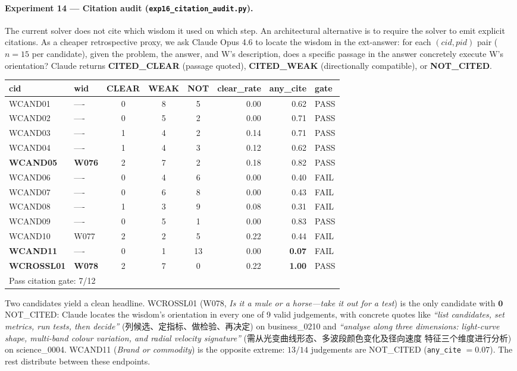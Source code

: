 \documentclass{article}
\begin{document}
\begin{CJK*}{UTF8}{gbsn}
\paragraph{Experiment 14 — Citation audit
(\texttt{exp16\_citation\_audit.py}).} The current solver does
not cite which wisdom it used on which step. An architectural
alternative is to require the solver to emit explicit citations.
As a cheaper retrospective proxy, we ask Claude Opus 4.6 to
locate the wisdom in the ext-answer: for each \((cid, pid)\)
pair (\(n = 15\) per candidate), given the problem, the answer,
and W's description, does a specific passage in the answer
concretely execute W's orientation? Claude returns
\textbf{CITED\_CLEAR} (passage quoted), \textbf{CITED\_WEAK}
(directionally compatible), or \textbf{NOT\_CITED}.

\begin{center}\small
\begin{tabular}{l l c c c r r l}
  \toprule
  cid & wid & CLEAR & WEAK & NOT & clear\_rate & any\_cite & gate \\
  \midrule
  WCAND01 & ---- & 0 & 8 & 5 & 0.00 & 0.62 & PASS \\
  WCAND02 & ---- & 0 & 5 & 2 & 0.00 & 0.71 & PASS \\
  WCAND03 & ---- & 1 & 4 & 2 & 0.14 & 0.71 & PASS \\
  WCAND04 & ---- & 1 & 4 & 3 & 0.12 & 0.62 & PASS \\
  \textbf{WCAND05} & \textbf{W076} & 2 & 7 & 2 & 0.18 & 0.82 & PASS \\
  WCAND06 & ---- & 0 & 4 & 6 & 0.00 & 0.40 & FAIL \\
  WCAND07 & ---- & 0 & 6 & 8 & 0.00 & 0.43 & FAIL \\
  WCAND08 & ---- & 1 & 3 & 9 & 0.08 & 0.31 & FAIL \\
  WCAND09 & ---- & 0 & 5 & 1 & 0.00 & 0.83 & PASS \\
  WCAND10 & W077 & 2 & 2 & 5 & 0.22 & 0.44 & FAIL \\
  \textbf{WCAND11} & ---- & 0 & 1 & 13 & 0.00 & \textbf{0.07} & FAIL \\
  \textbf{WCROSSL01} & \textbf{W078} & 2 & 7 & 0 & 0.22 & \textbf{1.00} & PASS \\
  \midrule
  \multicolumn{8}{l}{Pass citation gate: 7/12} \\
  \bottomrule
\end{tabular}
\end{center}

Two candidates yield a clean headline. WCROSSL01 (W078, \emph{Is
it a mule or a horse—take it out for a test}) is the only
candidate with \(\mathbf{0}\) NOT\_CITED: Claude locates the
wisdom's orientation in every one of 9 valid judgements, with
concrete quotes like \emph{``list candidates, set metrics, run
tests, then decide''} (列候选、定指标、做检验、再决定)
on business\_0210 and \emph{``analyse along three dimensions:
light-curve shape, multi-band colour variation, and radial
velocity signature''} (需从光变曲线形态、多波段颜色变化及径向速度
特征三个维度进行分析) on science\_0004. WCAND11 (\emph{Brand or
commodity}) is the opposite extreme: \(13/14\) judgements are
NOT\_CITED (\texttt{any\_cite} \(= 0.07\)). The rest distribute
between these endpoints.


\end{CJK*}
\end{document}
